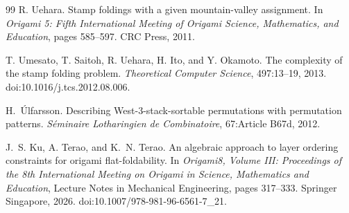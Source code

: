 \begin{thebibliography}{99}
R. Uehara.
\newblock Stamp foldings with a given mountain-valley assignment.
\newblock In \emph{Origami 5: Fifth International Meeting of Origami Science, Mathematics, and Education}, pages 585--597. CRC Press, 2011.

T. Umesato, T. Saitoh, R. Uehara, H. Ito, and Y. Okamoto.
\newblock The complexity of the stamp folding problem.
\newblock \emph{Theoretical Computer Science}, 497:13--19, 2013.
\newblock doi:10.1016/j.tcs.2012.08.006.

H.~{\'U}lfarsson.
\newblock Describing West-3-stack-sortable permutations with permutation patterns.
\newblock \emph{S{\'e}minaire Lotharingien de Combinatoire}, 67:Article B67d, 2012.

J.~S. Ku, A. Terao, and K.~N. Terao.
\newblock An algebraic approach to layer ordering constraints for origami flat-foldability.
\newblock In \emph{Origami8, Volume III: Proceedings of the 8th International Meeting on Origami in Science, Mathematics and Education}, Lecture Notes in Mechanical Engineering, pages 317--333. Springer Singapore, 2026.
\newblock doi:10.1007/978-981-96-6561-7\_21.

\end{thebibliography}
